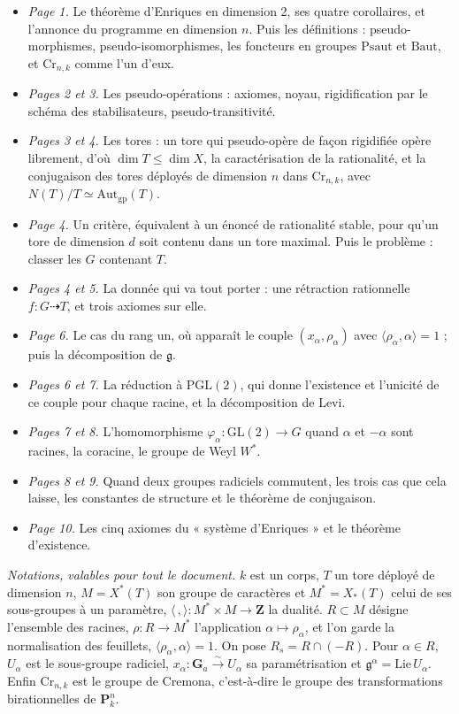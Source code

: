 \documentclass[11pt,a4paper]{article}
\begin{document}
\begin{itemize}
  \item \emph{Page 1.} Le théorème d'Enriques en dimension 2, ses quatre
    corollaires, et l'annonce du programme en dimension $n$. Puis les
    définitions : pseudo-morphismes, pseudo-isomorphismes, les foncteurs en
    groupes $\mathrm{Psaut}$ et $\mathrm{Baut}$, et $\mathrm{Cr}_{n,k}$ comme
    l'un d'eux.
  \item \emph{Pages 2 et 3.} Les pseudo-opérations : axiomes, noyau,
    rigidification par le schéma des stabilisateurs, pseudo-transitivité.
  \item \emph{Pages 3 et 4.} Les tores : un tore qui pseudo-opère de façon
    rigidifiée opère librement, d'où $\dim T \leq \dim X$, la caractérisation
    de la rationalité, et la conjugaison des tores déployés de dimension $n$
    dans $\mathrm{Cr}_{n,k}$, avec $N(T)/T \simeq \mathrm{Aut}_{\mathrm{gp}}(T)$.
  \item \emph{Page 4.} Un critère, équivalent à un énoncé de rationalité
    stable, pour qu'un tore de dimension $d$ soit contenu dans un tore maximal.
    Puis le problème : classer les $G$ contenant $T$.
  \item \emph{Pages 4 et 5.} La donnée qui va tout porter : une rétraction
    rationnelle $f : G \dashrightarrow T$, et trois axiomes sur elle.
  \item \emph{Page 6.} Le cas du rang un, où apparaît le couple $(x_\alpha,
    \rho_\alpha)$ avec $\langle \rho_\alpha, \alpha \rangle = 1$ ; puis la
    décomposition de $\mathfrak{g}$.
  \item \emph{Pages 6 et 7.} La réduction à $\mathrm{PGL}(2)$, qui donne
    l'existence et l'unicité de ce couple pour chaque racine, et la
    décomposition de Levi.
  \item \emph{Pages 7 et 8.} L'homomorphisme $\varphi_\alpha : \mathrm{GL}(2)
    \to G$ quand $\alpha$ et $-\alpha$ sont racines, la coracine, le groupe de
    Weyl $W^*$.
  \item \emph{Pages 8 et 9.} Quand deux groupes radiciels commutent, les trois
    cas que cela laisse, les constantes de structure et le théorème de
    conjugaison.
  \item \emph{Page 10.} Les cinq axiomes du « système d'Enriques » et le
    théorème d'existence.
\end{itemize}

\emph{Notations, valables pour tout le document.} $k$ est un corps, $T$ un tore
déployé de dimension $n$, $M = X^*(T)$ son groupe de caractères et $M^* =
X_*(T)$ celui de ses sous-groupes à un paramètre, $\langle\,,\rangle : M^*
\times M \to \mathbf{Z}$ la dualité. $R \subset M$ désigne l'ensemble des
racines, $\rho : R \to M^*$ l'application $\alpha \mapsto \rho_\alpha$, et l'on
garde la normalisation des feuillets, $\langle \rho_\alpha, \alpha \rangle =
1$. On pose $R_s = R \cap (-R)$. Pour $\alpha \in R$, $U_\alpha$ est le
sous-groupe radiciel, $x_\alpha : \mathbf{G}_a \xrightarrow{\ \sim\ } U_\alpha$
sa paramétrisation et $\mathfrak{g}^\alpha = \mathrm{Lie}\,U_\alpha$. Enfin
$\mathrm{Cr}_{n,k}$ est le groupe de Cremona, c'est-à-dire le groupe des
transformations birationnelles de $\mathbf{P}^n_k$.
\end{document}
